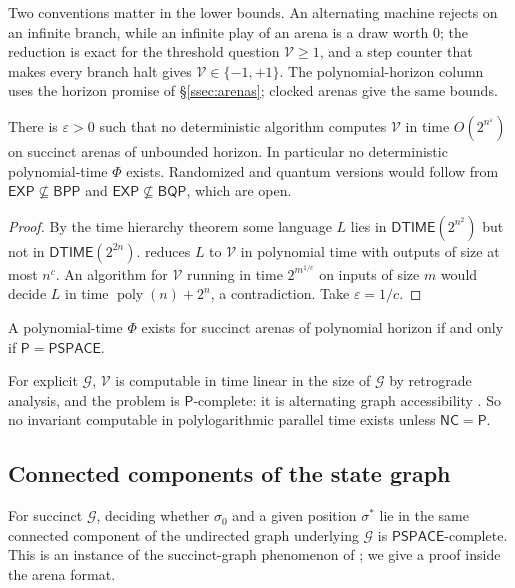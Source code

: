 \documentclass[final]{siamart0516}
\numberwithin{theorem}{section}
\numberwithin{equation}{section}
\theoremstyle{siamnonum}
\theoremstyle{plain}
\newcommand{\val}{\mathcal{V}}            %
\newcommand{\SG}{\mathcal{G}}             %
\newcommand{\poly}{\operatorname{poly}}
\newcommand{\cls}[1]{\mathsf{#1}}
\newcommand{\PSPACE}{\cls{PSPACE}}
\newcommand{\EXP}{\cls{EXP}}
\newcommand{\BPP}{\cls{BPP}}
\newcommand{\BQP}{\cls{BQP}}
\newcommand{\Pclass}{\cls{P}}
\newcommand{\NC}{\cls{NC}}
\begin{document}
Two conventions matter in the lower bounds. An alternating machine rejects on an infinite branch, while an infinite play of an arena is a draw worth $0$; the reduction is exact for the threshold question $\val\ge1$, and a step counter that makes every branch halt gives $\val\in\{-1,+1\}$. The polynomial-horizon column uses the horizon promise of \S\ref{ssec:arenas}; clocked arenas give the same bounds.

\begin{corollary}\label{cor:exp}
There is $\varepsilon>0$ such that no deterministic algorithm computes $\val$ in time $O(2^{n^{\varepsilon}})$ on succinct arenas of unbounded horizon. In particular no deterministic polynomial-time $\Phi$ exists. Randomized and quantum versions would follow from $\EXP\not\subseteq\BPP$ and $\EXP\not\subseteq\BQP$, which are open.
\end{corollary}

\begin{proof}
By the time hierarchy theorem \cite{HartmanisStearns} some language $L$ lies in $\mathsf{DTIME}(2^{n^2})$ but not in $\mathsf{DTIME}(2^{2n})$.  reduces $L$ to $\val$ in polynomial time with outputs of size at most $n^c$. An algorithm for $\val$ running in time $2^{m^{1/c}}$ on inputs of size $m$ would decide $L$ in time $\poly(n)+2^{n}$, a contradiction. Take $\varepsilon=1/c$.
\end{proof}

\begin{corollary}\label{cor:polyhorizon}
A polynomial-time $\Phi$ exists for succinct arenas of polynomial horizon if and only if $\Pclass=\PSPACE$.
\end{corollary}

\begin{proposition}\label{prop:explicit}
For explicit $\SG$, $\val$ is computable in time linear in the size of $\SG$ by retrograde analysis, and the problem is $\Pclass$-complete: it is alternating graph accessibility \cite{Immerman,GHR}. So no invariant computable in polylogarithmic parallel time exists unless $\NC=\Pclass$.
\end{proposition}

\subsection{Connected components of the state graph}

\begin{proposition}\label{prop:components}
For succinct $\SG$, deciding whether $\sigma_0$ and a given position $\sigma^{*}$ lie in the same connected component of the undirected graph underlying $\SG$ is $\PSPACE$-complete. This is an instance of the succinct-graph phenomenon of \cite{GalperinWigderson,PapadimitriouYannakakis,LozanoBalcazar}; we give a proof inside the arena format.
\end{proposition}
\end{document}
